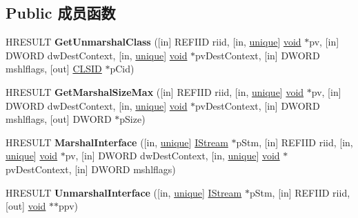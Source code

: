 \subsection*{Public 成员函数}
\begin{DoxyCompactItemize}
\item 
\mbox{\label{interface_i_marshal_aeb0e43e7865f59bee6f3964dd5edda2e}} 
H\+R\+E\+S\+U\+LT {\bfseries Get\+Unmarshal\+Class} (\mbox{[}in\mbox{]} R\+E\+F\+I\+ID riid, \mbox{[}in, \hyperlink{interfaceunique}{unique}\mbox{]} \hyperlink{interfacevoid}{void} $\ast$pv, \mbox{[}in\mbox{]} D\+W\+O\+RD dw\+Dest\+Context, \mbox{[}in, \hyperlink{interfaceunique}{unique}\mbox{]} \hyperlink{interfacevoid}{void} $\ast$pv\+Dest\+Context, \mbox{[}in\mbox{]} D\+W\+O\+RD mshlflags, \mbox{[}out\mbox{]} \hyperlink{struct___i_i_d}{C\+L\+S\+ID} $\ast$p\+Cid)
\item 
\mbox{\label{interface_i_marshal_a3df08cb3d22c3a908d3c1b100a17b4dc}} 
H\+R\+E\+S\+U\+LT {\bfseries Get\+Marshal\+Size\+Max} (\mbox{[}in\mbox{]} R\+E\+F\+I\+ID riid, \mbox{[}in, \hyperlink{interfaceunique}{unique}\mbox{]} \hyperlink{interfacevoid}{void} $\ast$pv, \mbox{[}in\mbox{]} D\+W\+O\+RD dw\+Dest\+Context, \mbox{[}in, \hyperlink{interfaceunique}{unique}\mbox{]} \hyperlink{interfacevoid}{void} $\ast$pv\+Dest\+Context, \mbox{[}in\mbox{]} D\+W\+O\+RD mshlflags, \mbox{[}out\mbox{]} D\+W\+O\+RD $\ast$p\+Size)
\item 
\mbox{\label{interface_i_marshal_a56f4485a95a5a663efb4138d38d93515}} 
H\+R\+E\+S\+U\+LT {\bfseries Marshal\+Interface} (\mbox{[}in, \hyperlink{interfaceunique}{unique}\mbox{]} \hyperlink{interface_i_stream}{I\+Stream} $\ast$p\+Stm, \mbox{[}in\mbox{]} R\+E\+F\+I\+ID riid, \mbox{[}in, \hyperlink{interfaceunique}{unique}\mbox{]} \hyperlink{interfacevoid}{void} $\ast$pv, \mbox{[}in\mbox{]} D\+W\+O\+RD dw\+Dest\+Context, \mbox{[}in, \hyperlink{interfaceunique}{unique}\mbox{]} \hyperlink{interfacevoid}{void} $\ast$pv\+Dest\+Context, \mbox{[}in\mbox{]} D\+W\+O\+RD mshlflags)
\item 
\mbox{\label{interface_i_marshal_ae860cc3d648b2fc054bb18b2f8bcd882}} 
H\+R\+E\+S\+U\+LT {\bfseries Unmarshal\+Interface} (\mbox{[}in, \hyperlink{interfaceunique}{unique}\mbox{]} \hyperlink{interface_i_stream}{I\+Stream} $\ast$p\+Stm, \mbox{[}in\mbox{]} R\+E\+F\+I\+ID riid, \mbox{[}out\mbox{]} \hyperlink{interfacevoid}{void} $\ast$$\ast$ppv)
$$
\end{DoxyCompactItemize}
